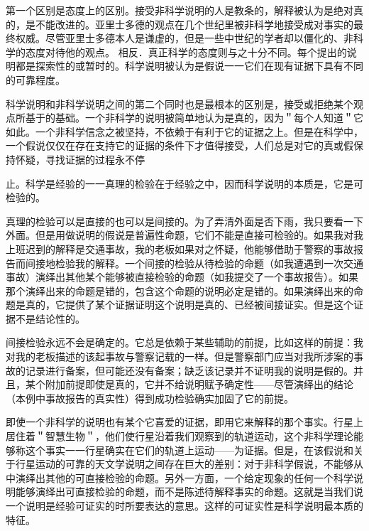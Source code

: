 第一个区别是态度上的区别。接受非科学说明的人是教条的，解释被认为是绝对真的，是不能改进的。亚里士多德的观点在几个世纪里被非科学地接受成对事实的最终权威。尽管亚里士多德本人是谦虚的，但是一些中世纪的学者却以僵化的、非科学的态度对待他的观点。\cite{crombie1960} 相反．真正科学的态度则与之十分不同。每个提出的说明都是探索性的或暂时的。科学说明被认为是假说一一它们在现有证据下具有不同的可靠程度。

科学说明和非科学说明之间的第二个同时也是最根本的区别是，接受或拒绝某个观点所基于的基础。一个非科学的说明被简单地认为是真的，因为＂每个人知道＂它如此。一个非科学信念之被坚持，不依赖于有利于它的证据之上。但是在科学中，一个假说仅仅在存在支持它的证据的条件下才值得接受，人们总是对它的真或假保持怀疑，寻找证据的过程永不停

止。科学是经验的一一真理的检验在于经验之中，因而科学说明的本质是，它是可检验的。

真理的检验可以是直接的也可以是间接的。为了弄清外面是否下雨，我只要看一下外面。但是用做说明的假说是普遍性命题，它们不能是直接可检验的。如果我对我上班迟到的解释是交通事故，我的老板如果对之怀疑，他能够借助于警察的事故报告而间接地检验我的解释。一个间接的检验从待检验的命题（如我遭遇到一次交通事故）演绎出其他某个能够被直接检验的命题（如我提交了一个事故报告）。如果那个演绎出来的命题是错的，包含这个命题的说明必定是错的。如果演绎出来的命题是真的，它提供了某个证据证明这个说明是真的、已经被间接证实。但是这个证据不是结论性的。

间接检验永远不会是确定的。它总是依赖于某些辅助的前提，比如这样的前提：我对我的老板描述的该起事故与警察记载的一样。但是警察部门应当对我所涉案的事故的记录进行备案，但可能还没有备案；缺乏该记录并不证明我的说明是假的。并且，某个附加前提即使是真的，它并不给说明赋予确定性——尽管演绎出的结论（本例中事故报告的真实性）得到成功检验确实加固了它的前提。

即使一个非科学的说明也有某个它喜爱的证据，即用它来解释的那个事实。行星上居住着＂智慧生物＂，他们使行星沿着我们观察到的轨道运动，这个非科学理论能够称这个事实一一行星确实在它们的轨道上运动——为证据。但是，在该假说和关于行星运动的可靠的天文学说明之间存在巨大的差别：对于非科学假说，不能够从中演绎出其他的可直接检验的命题。另外一方面，一个给定现象的任何一个科学说明能够演绎出可直接检验的命题，而不是陈述待解释事实的命题。这就是当我们说一个说明是经验可证实的时所要表达的意思。这样的可证实性是科学说明最本质的特征。\cite{popper1935}

